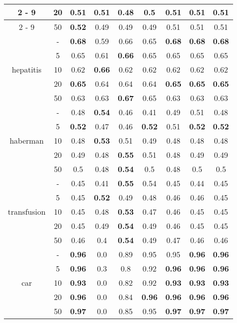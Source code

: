 \documentclass{article}%
\begin{document}
\begin{tabular}{c|c|ccccccc}
\cline{2%
-%
9}%
&20&\textbf{0.51}&\textbf{0.51}&0.48&0.5&\textbf{0.51}&\textbf{0.51}&\textbf{0.51}\\%
\cline{2%
-%
9}%
&50&\textbf{0.52}&0.49&0.49&0.49&0.51&0.51&0.51\\%
\hline%
\multirow{5}{*}{hepatitis}&{-}&\textbf{0.68}&0.59&0.66&0.65&\textbf{0.68}&\textbf{0.68}&\textbf{0.68}\\%
\cline{2%
-%
9}%
&5&0.65&0.61&\textbf{0.66}&0.65&0.65&0.65&0.65\\%
\cline{2%
-%
9}%
&10&0.62&\textbf{0.66}&0.62&0.62&0.62&0.62&0.62\\%
\cline{2%
-%
9}%
&20&\textbf{0.65}&0.64&0.64&0.64&\textbf{0.65}&\textbf{0.65}&\textbf{0.65}\\%
\cline{2%
-%
9}%
&50&0.63&0.63&\textbf{0.67}&0.65&0.63&0.63&0.63\\%
\hline%
\multirow{5}{*}{haberman}&{-}&0.48&\textbf{0.54}&0.46&0.41&0.49&0.51&0.48\\%
\cline{2%
-%
9}%
&5&\textbf{0.52}&0.47&0.46&\textbf{0.52}&0.51&\textbf{0.52}&\textbf{0.52}\\%
\cline{2%
-%
9}%
&10&0.48&\textbf{0.53}&0.51&0.49&0.48&0.48&0.48\\%
\cline{2%
-%
9}%
&20&0.49&0.48&\textbf{0.55}&0.51&0.48&0.49&0.49\\%
\cline{2%
-%
9}%
&50&0.5&0.48&\textbf{0.54}&0.5&0.48&0.5&0.5\\%
\hline%
\multirow{5}{*}{transfusion}&{-}&0.45&0.41&\textbf{0.55}&0.54&0.45&0.44&0.45\\%
\cline{2%
-%
9}%
&5&0.45&\textbf{0.52}&0.49&0.48&0.46&0.46&0.45\\%
\cline{2%
-%
9}%
&10&0.45&0.48&\textbf{0.53}&0.47&0.46&0.45&0.45\\%
\cline{2%
-%
9}%
&20&0.45&0.49&\textbf{0.54}&0.49&0.46&0.45&0.45\\%
\cline{2%
-%
9}%
&50&0.46&0.4&\textbf{0.54}&0.49&0.47&0.46&0.46\\%
\hline%
\multirow{5}{*}{car}&{-}&\textbf{0.96}&0.0&0.89&0.95&0.95&\textbf{0.96}&\textbf{0.96}\\%
\cline{2%
-%
9}%
&5&\textbf{0.96}&0.3&0.8&0.92&\textbf{0.96}&\textbf{0.96}&\textbf{0.96}\\%
\cline{2%
-%
9}%
&10&\textbf{0.93}&0.0&0.82&0.92&\textbf{0.93}&\textbf{0.93}&\textbf{0.93}\\%
\cline{2%
-%
9}%
&20&\textbf{0.96}&0.0&0.84&\textbf{0.96}&\textbf{0.96}&\textbf{0.96}&\textbf{0.96}\\%
\cline{2%
-%
9}%
&50&\textbf{0.97}&0.0&0.85&0.95&\textbf{0.97}&\textbf{0.97}&\textbf{0.97}\\%

\end{tabular}
\end{document}

